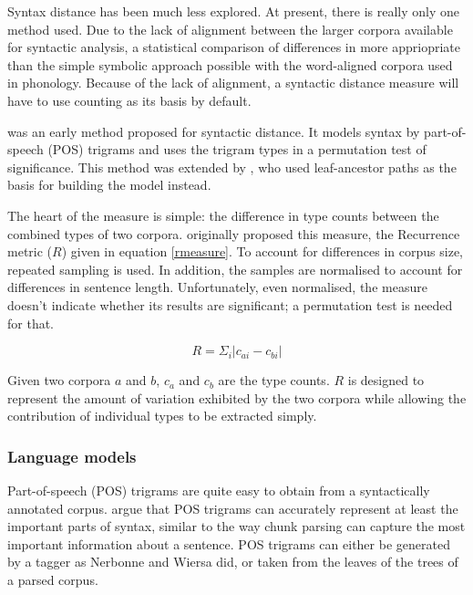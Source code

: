 \documentclass[11pt]{article}
\begin{document}
Syntax distance has been much less explored. At present, there is
really only one method used. Due to the lack of alignment between the
larger corpora available for syntactic analysis, a statistical
comparison of differences in more appriopriate than the simple
symbolic approach possible with the word-aligned corpora used in
phonology. Because of the lack of alignment, a syntactic distance
measure will have to use counting as its basis by default.

 was an early method proposed for syntactic
distance.  It models syntax by part-of-speech (POS) trigrams and uses
the trigram types in a permutation test of significance. This method was
extended by , who used 
leaf-ancestor paths as the basis for building the model instead.

The heart of the measure is simple: the difference in type counts
between the combined types of two corpora. 
originally proposed this measure, the {\sc Recurrence}
metric ($R$) given in equation \ref{rmeasure}. To account for differences
in corpus size, repeated sampling is used. In addition, the samples
are normalised to account for differences in sentence length.
Unfortunately, even normalised, the measure doesn't indicate whether
its results are significant; a permutation test is needed for that.

\begin{equation}
R = \Sigma_i |c_{ai} - c_{bi}|
\label{rmeasure}
\end{equation}

Given two corpora $a$ and $b$, $c_a$ and $c_b$ are the type counts.
$R$ is designed to represent the amount of variation exhibited by the
two corpora while allowing the contribution of individual types to be
extracted simply.


\subsubsection{Language models}
Part-of-speech (POS) trigrams are quite easy to obtain from a syntactically
annotated corpus.  argue that POS trigrams
can accurately represent at least the important parts of syntax,
similar to the way chunk parsing can capture the most important
information about a sentence. POS trigrams can either be generated by
a tagger as Nerbonne and Wiersa did, or taken from the leaves of
the trees of a parsed corpus.
\end{document}
